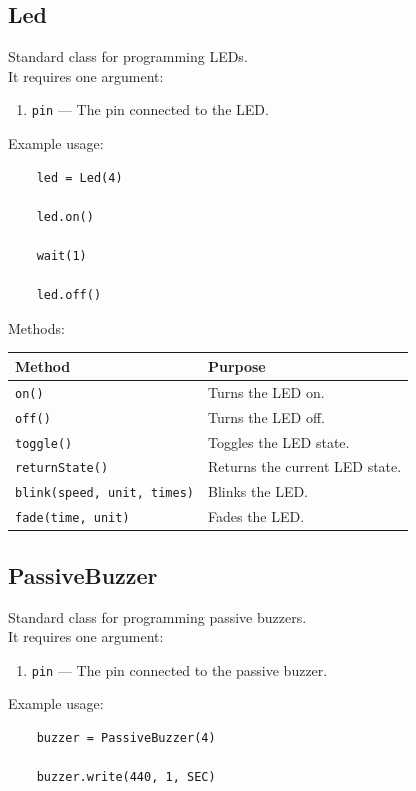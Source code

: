 \subsection{Led}

Standard class for programming LEDs.\\
It requires one argument:

\begin{enumerate}
	\item \texttt{pin} --- The pin connected to the LED.
\end{enumerate}

Example usage:

\begin{lstlisting}
	led = Led(4)
	
	led.on()
	
	wait(1)
	
	led.off()
\end{lstlisting}

Methods:

\begin{tabular}{ll}
	\toprule
	\textbf{Method} & \textbf{Purpose}\\
	\midrule
	\texttt{on()} & Turns the LED on.\\
	\texttt{off()} & Turns the LED off.\\
	\texttt{toggle()} & Toggles the LED state.\\
	\texttt{returnState()} & Returns the current LED state.\\
	\texttt{blink(speed, unit, times)} & Blinks the LED.\\
	\texttt{fade(time, unit)} & Fades the LED.\\
	\bottomrule
\end{tabular}


\subsection{PassiveBuzzer}

Standard class for programming passive buzzers.\\
It requires one argument:

\begin{enumerate}
	\item \texttt{pin} --- The pin connected to the passive buzzer.
\end{enumerate}

Example usage:

\begin{lstlisting}
	buzzer = PassiveBuzzer(4)
	
	buzzer.write(440, 1, SEC)
\end{lstlisting}

